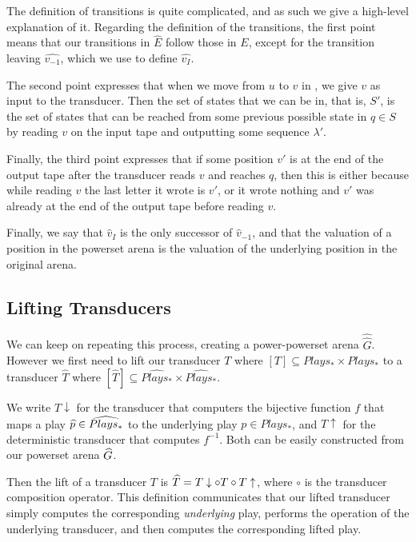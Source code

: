 \documentclass[ %
                    author={Leo Poulson},
                supervisor={Dr. Steven Ramsay},
                    degree={BSc},
                     title={Epistemic Planning for the Dynamic Gossip problem},
                  subtitle={},
                      year={2019} ]{dissertation}
\begin{document}
The definition of transitions is quite complicated, and as such we give a high-level
explanation of it. Regarding the definition of the transitions,
the first point means that our transitions in $\widehat{E}$ follow those in $E$,
except for the transition leaving $\widehat{v_{-1}}$, which we use to define
$\widehat{v_I}$. 

The second point expresses that when we move from $u$ to $v$ in , we give
$v$ as input to the transducer. Then the set of states that we can be in, that
is, $S'$, is the set of states that can be reached from some previous possible
state in $q \in S$ by reading $v$ on the input tape and outputting some sequence
$\lambda'$.

Finally, the third point expresses that if some position $v'$ is at the end of
the output tape after the transducer reads $v$ and reaches $q$, then this is either
because while reading $v$ the last letter it wrote is $v'$, or it wrote nothing
and $v'$ was already at the end of the output tape before reading $v$. 

Finally, we say that $\widehat{v}_I$ is the only successor of
$\widehat{v}_{-1}$, and that the valuation of a position in the powerset arena
is the valuation of the underlying position in the original arena. 

\subsection{Lifting Transducers}
\label{sec:LiftingTransducers}

We can keep on repeating this process, creating a power-powerset arena
$\widehat{\widehat{G}}$. However we first need to lift our transducer $T$ where
$[T] \subseteq Plays_\ast \times Plays_\ast$ to a transducer $\widehat{T}$ where
$[\widehat{T}] \subseteq \widehat{Plays_\ast} \times \widehat{Plays_\ast}$.

We write $T\downarrow$ for the transducer that computers the bijective function
$f$ that maps a play $\widehat{p} \in \widehat{Plays_\ast}$ to the underlying play $p
\in Plays_\ast$, and $T\uparrow$ for the deterministic transducer that computes
$f^{-1}$. Both can be easily constructed from our powerset arena $\widehat{G}$.

Then the lift of a transducer $T$ is $\widehat{T} = T\downarrow \circ T \circ
T\uparrow$, where $\circ$ is the transducer composition operator. This
definition communicates that our lifted transducer simply computes the
corresponding \emph{underlying} play, performs the operation of the underlying
transducer, and then computes the corresponding lifted play. 
\end{document}
